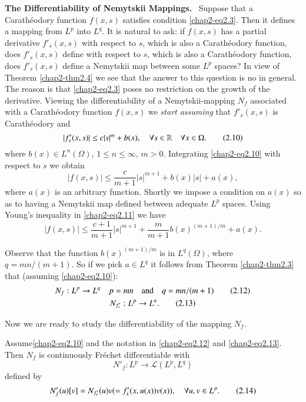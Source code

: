 \noindent
{\bf The Differentiability of Nemytskii Mappings.}~ Suppose that a
Cara\-th\'eodory function $f(x,s)$ satisfies condition
\eqref{chap2-eq2.3}. Then it defines a mapping from $L^{p}$ into
$L^{q}$. It is natural to ask: if $f(x,s)$ has a partial derivative
$f'_{s}(x,s)$ with respect to $s$, which is also a Carath\'eodory
function, does $f'_{s}(x,s)$ define with respect to $s$, which is also
a Carath\'eodory function, does $f'_{s}(x,s)$ define a Nemytskii map
between some $L^{p}$ spaces? In view of Theorem \ref{chap2-thm2.4} we
see that the answer to this question is no in general. The reason is
that \eqref{chap2-eq2.3} poses no restriction on the growth of the
derivative. Viewing the differentiability of a Nemytskii-mapping
$N_{f}$ associated with a Carath\'eodory function $f(x,s)$ we {\em
  start assuming} that $f'_{s}(x,s)$ is Carath\'eodory and
\begin{equation*}
|f'_{s}(x,s)|\leq c|s|^{m}+b(x),\quad \forall s\in \mathbb{R}\quad \forall
x\in \Omega.\tag{2.10}\label{chap2-eq2.10}
\end{equation*}
where $b(x)\in L^{n}(\Omega)$, $1\leq n\leq \infty$,
$m>0$. Integrating \eqref{chap2-eq2.10} with respect to $s$ we obtain
\begin{equation*}
|f(x,s)|\leq
\frac{c}{m+1}|s|^{m+1}+b(x)|s|+a(x),\tag{2.11}\label{chap2-eq2.11} 
\end{equation*}
where $a(x)$ is an arbitrary function. Shortly we impose a condition
on $a(x)$ so as to having a Nemytskii map defined between adequate
$L^{p}$ spaces. Using Young's inequality in \eqref{chap2-eq2.11} we
have
$$
|f(x,s)|\leq
\frac{c+1}{m+1}|s|^{m+1}+\frac{m}{m+1}b(x)^{(m+1)/m}+a(x). 
$$

Observe that the function $b(x)^{(m+1)/m}$ is in $L^{q}(\Omega)$,
where $q=mn/(m+1)$. So if we pick $a\in L^{q}$ it follows from Theorem
\ref{chap2-thm2.3} that (assuming \eqref{chap2-eq2.10}): 
\begin{gather*}
N_{f}:L^{p}\to L^{q}\quad p=mn\quad \text{and}\quad
q=mn/(m+1)\tag{2.12}\label{chap2-eq2.12}\\ 
N_{f'_{*}}:L^{p}\to L^{n}.\tag{2.13}\label{chap2-eq2.13} 
\end{gather*}

Now we are ready to study the differentiability of the mapping
$N_{f}$. 

\begin{theorem}\label{chap2-thm2.6}
Assume\pageoriginale \eqref{chap2-eq2.10} and the notation in
\eqref{chap2-eq2.12} and \eqref{chap2-eq2.13}. Then $N_{f}$ is
continuously Fr\'echet differentiable with 
$$
N'_{f}:L^{p}\to \mathcal{L}(L^{p},L^{q})
$$ 
defined by
\begin{equation*}
N'_{f}(u)[v]=N_{f'_{*}}(u)v(=f'_{s}(x,u(x))v(x)),\quad \forall u, v\in
L^{p}.\tag{2.14}\label{chap2-eq2.14} 
\end{equation*}
\end{theorem}

